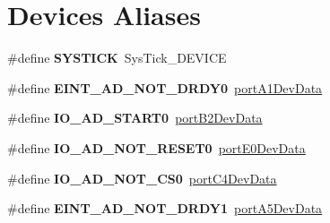 \hypertarget{group___dev_ala}{\section{Devices Aliases}
\label{group___dev_ala}
}
\begin{DoxyCompactItemize}
\item 
\hypertarget{group___dev_ala_gad942404ac7d5ff6c1c65dec93525dcb9}{\#define {\bfseries S\-Y\-S\-T\-I\-C\-K}~Sys\-Tick\-\_\-\-D\-E\-V\-I\-C\-E}\label{group___dev_ala_gad942404ac7d5ff6c1c65dec93525dcb9}

\end{DoxyCompactItemize}
\begin{DoxyCompactItemize}
\item 
\hypertarget{group___dev_ala_gace90856605a94501593c944999ffb43c}{\#define {\bfseries E\-I\-N\-T\-\_\-\-A\-D\-\_\-\-N\-O\-T\-\_\-\-D\-R\-D\-Y0}~\hyperlink{group___log_dev_dat_str_ptr_gac1534206954365f5a87692491a4081f4}{port\-A1\-Dev\-Data}}\label{group___dev_ala_gace90856605a94501593c944999ffb43c}

\item 
\hypertarget{group___dev_ala_gab09e52fdf8e972ccb0cdc9d1f5ab638e}{\#define {\bfseries I\-O\-\_\-\-A\-D\-\_\-\-S\-T\-A\-R\-T0}~\hyperlink{group___log_dev_dat_str_ptr_ga5df104d1126e0dbdc7b960e99084265f}{port\-B2\-Dev\-Data}}\label{group___dev_ala_gab09e52fdf8e972ccb0cdc9d1f5ab638e}

\item 
\hypertarget{group___dev_ala_gab53b4d543722b48ed4cada9f8816ede9}{\#define {\bfseries I\-O\-\_\-\-A\-D\-\_\-\-N\-O\-T\-\_\-\-R\-E\-S\-E\-T0}~\hyperlink{group___log_dev_dat_str_ptr_gaaab8c3a3b8a3fb40f084afa6533a00b3}{port\-E0\-Dev\-Data}}\label{group___dev_ala_gab53b4d543722b48ed4cada9f8816ede9}

\item 
\hypertarget{group___dev_ala_gaec17562e448380b72a6789e9fb3b1698}{\#define {\bfseries I\-O\-\_\-\-A\-D\-\_\-\-N\-O\-T\-\_\-\-C\-S0}~\hyperlink{group___log_dev_dat_str_ptr_ga0ff194dd67ec822403f056fc699fff93}{port\-C4\-Dev\-Data}}\label{group___dev_ala_gaec17562e448380b72a6789e9fb3b1698}

\item 
\hypertarget{group___dev_ala_ga7823afbcda1773c09d83375faf981ffb}{\#define {\bfseries E\-I\-N\-T\-\_\-\-A\-D\-\_\-\-N\-O\-T\-\_\-\-D\-R\-D\-Y1}~\hyperlink{group___log_dev_dat_str_ptr_ga10deed43e77a143dfc11843dc05e7d38}{port\-A5\-Dev\-Data}}\label{group___dev_ala_ga7823afbcda1773c09d83375faf981ffb}


\end{DoxyCompactItemize}

